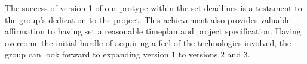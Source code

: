 The success of version 1 of our protype within the set deadlines is a testament to the group's
dedication to the project. This achievement also provides valuable affirmation to having set a reasonable timeplan and project 
specification. Having overcome the initial hurdle of acquiring a feel of the technologies involved,
the group can look forward to expanding version 1 to versions 2 and 3.